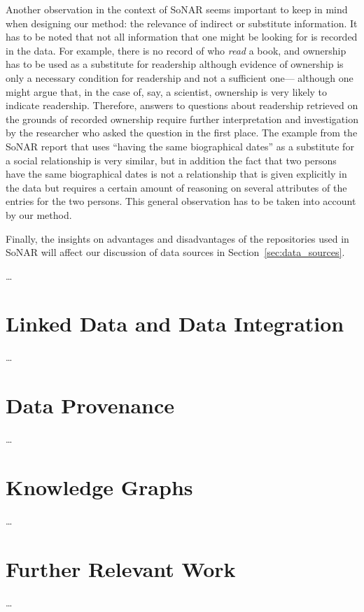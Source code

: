 Another observation in the context of SoNAR seems important to keep in mind
when designing our method: the relevance of indirect or substitute information.
It has to be noted that not all information that one might be looking for is recorded
in the data. For example, there is no record of who \emph{read} a book,
and ownership has to be used as a substitute for readership although evidence
of ownership is only a necessary condition for readership and not a sufficient one---%
although one might argue that, in the case of, say, a scientist, ownership is very likely
to indicate readership.
Therefore, answers to questions
about readership retrieved on the grounds of recorded ownership require further interpretation and investigation
by the researcher who asked the question in the first place.
The example from the SoNAR report that uses \enquote{having the same biographical dates}
as a substitute for a social relationship is very similar, but in addition
the fact that two persons have the same biographical dates is not a relationship that is
given explicitly in the data but requires a certain amount of reasoning on several attributes of the entries
for the two persons.
This general observation has to be taken into account by our method.

Finally, the insights on advantages and disadvantages of the repositories used in SoNAR
will affect our discussion of data sources in Section~\ref{sec:data_sources}.





\dots

\section{Linked Data and Data Integration}
\label{sec:linked_data+integration}

\dots


\section{Data Provenance}
\label{sec:data_provenance}

\dots


\section{Knowledge Graphs}
\label{sec:KGs}

\dots


\section{Further Relevant Work}
\label{sec:further}

\dots


